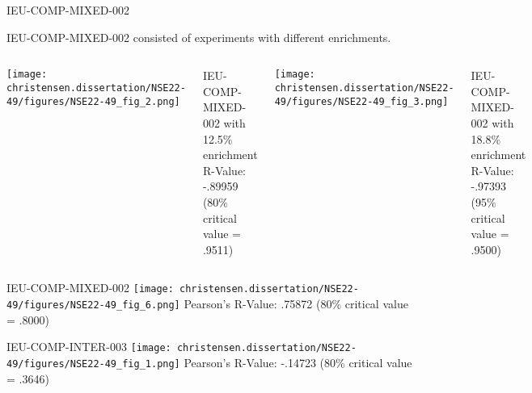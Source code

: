 \documentclass[10pt,aspectratio=169]{beamer}              %
\begin{document}
\begin{frame}{IEU-COMP-MIXED-002}
    \begin{block}{}
        IEU-COMP-MIXED-002 consisted of experiments with different enrichments.
    \end{block}
    \begin{columns}
            \centering
            \texttt{[image: christensen.dissertation/NSE22-49/figures/NSE22-49\_fig\_2.png]}
            \begin{footnotesize}
                IEU-COMP-MIXED-002 with 12.5\% enrichment \\
                R-Value: -.89959 (80\% critical value = .9511)
            \end{footnotesize}
            \centering
            \texttt{[image: christensen.dissertation/NSE22-49/figures/NSE22-49\_fig\_3.png]}
            \begin{footnotesize}
                IEU-COMP-MIXED-002 with 18.8\% enrichment \\
                R-Value: -.97393 (95\% critical value = .9500)
            \end{footnotesize}
            \end{columns}
\end{frame}

\begin{frame}{IEU-COMP-MIXED-002}
    \centering
    \texttt{[image: christensen.dissertation/NSE22-49/figures/NSE22-49\_fig\_6.png]}
    Pearson's R-Value: .75872 (80\% critical value = .8000)
\end{frame}

\begin{frame}{IEU-COMP-INTER-003}
    \centering
    \texttt{[image: christensen.dissertation/NSE22-49/figures/NSE22-49\_fig\_1.png]}
    Pearson's R-Value: -.14723 (80\% critical value = .3646)
\end{frame}
\end{document}
